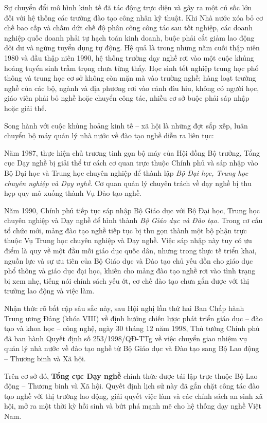 Sự chuyển đổi mô hình kinh tế đã tác động trực diện và gây ra một cú sốc lớn đối với hệ thống các trường đào tạo công nhân kỹ thuật. Khi Nhà nước xóa bỏ cơ chế bao cấp và chấm dứt chế độ phân công công tác sau tốt nghiệp, các doanh nghiệp quốc doanh phải tự hạch toán kinh doanh, buộc phải cắt giảm lao động dôi dư và ngừng tuyển dụng tự động. Hệ quả là trong những năm cuối thập niên 1980 và đầu thập niên 1990, hệ thống trường dạy nghề rơi vào một cuộc khủng hoảng tuyển sinh trầm trọng chưa từng thấy. Học sinh tốt nghiệp trung học phổ thông và trung học cơ sở không còn mặn mà vào trường nghề; hàng loạt trường nghề của các bộ, ngành và địa phương rơi vào cảnh đìu hiu, không có người học, giáo viên phải bỏ nghề hoặc chuyển công tác, nhiều cơ sở buộc phải sáp nhập hoặc giải thể.

Song hành với cuộc khủng hoảng kinh tế -- xã hội là những đợt sắp xếp, luân chuyển bộ máy quản lý nhà nước về đào tạo nghề diễn ra liên tục:

Năm 1987, thực hiện chủ trương tinh gọn bộ máy của Hội đồng Bộ trưởng, Tổng cục Dạy nghề bị giải thể tư cách cơ quan trực thuộc Chính phủ và sáp nhập vào Bộ Đại học và Trung học chuyên nghiệp để thành lập \textit{Bộ Đại học, Trung học chuyên nghiệp và Dạy nghề}. Cơ quan quản lý chuyên trách về dạy nghề bị thu hẹp quy mô xuống thành Vụ Đào tạo nghề.

Năm 1990, Chính phủ tiếp tục sáp nhập Bộ Giáo dục với Bộ Đại học, Trung học chuyên nghiệp và Dạy nghề để hình thành \textit{Bộ Giáo dục và Đào tạo}. Trong cơ cấu tổ chức mới, mảng đào tạo nghề tiếp tục bị thu gọn thành một bộ phận trực thuộc Vụ Trung học chuyên nghiệp và Dạy nghề. Việc sáp nhập này tuy có ưu điểm là quy về một đầu mối giáo dục quốc dân, nhưng trong thực tế triển khai, nguồn lực và sự ưu tiên của Bộ Giáo dục và Đào tạo chủ yếu dồn cho giáo dục phổ thông và giáo dục đại học, khiến cho mảng đào tạo nghề rơi vào tình trạng bị xem nhẹ, tiếng nói chính sách yếu ớt, cơ chế đào tạo chưa gắn được với thị trường lao động và việc làm.

Nhận thức rõ bất cập sâu sắc này, sau Hội nghị lần thứ hai Ban Chấp hành Trung ương Đảng (khóa VIII) về định hướng chiến lược phát triển giáo dục -- đào tạo và khoa học -- công nghệ, ngày 30 tháng 12 năm 1998, Thủ tướng Chính phủ đã ban hành Quyết định số 253/1998/QĐ-TTg về việc chuyển giao nhiệm vụ quản lý nhà nước về đào tạo nghề từ Bộ Giáo dục và Đào tạo sang Bộ Lao động -- Thương binh và Xã hội. 

Trên cơ sở đó, \textbf{Tổng cục Dạy nghề} chính thức được tái lập trực thuộc Bộ Lao động -- Thương binh và Xã hội. Quyết định lịch sử này đã gắn chặt công tác đào tạo nghề với thị trường lao động, giải quyết việc làm và các chính sách an sinh xã hội, mở ra một thời kỳ hồi sinh và bứt phá mạnh mẽ cho hệ thống dạy nghề Việt Nam.


